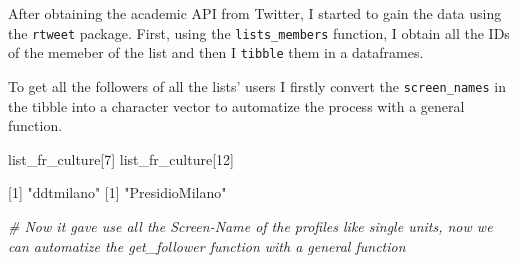 \documentclass[
]{article}
\newenvironment{Shaded}{\begin{snugshade}}{\end{snugshade}}
\newcommand{\AttributeTok}[1]{\textcolor[rgb]{0.77,0.63,0.00}{#1}}
\newcommand{\CommentTok}[1]{\textcolor[rgb]{0.56,0.35,0.01}{\textit{#1}}}
\newcommand{\ConstantTok}[1]{\textcolor[rgb]{0.00,0.00,0.00}{#1}}
\newcommand{\DecValTok}[1]{\textcolor[rgb]{0.00,0.00,0.81}{#1}}
\newcommand{\FunctionTok}[1]{\textcolor[rgb]{0.00,0.00,0.00}{#1}}
\newcommand{\NormalTok}[1]{#1}
\newcommand{\OtherTok}[1]{\textcolor[rgb]{0.56,0.35,0.01}{#1}}
\newcommand{\SpecialCharTok}[1]{\textcolor[rgb]{0.00,0.00,0.00}{#1}}
\newcommand{\StringTok}[1]{\textcolor[rgb]{0.31,0.60,0.02}{#1}}
\begin{document}
After obtaining the academic API from Twitter, I started to gain the
data using the \texttt{rtweet} package. First, using the
\texttt{lists\_members} function, I obtain all the IDs of the memeber of
the list and then I \texttt{tibble} them in a dataframes.

\begin{Shaded}
\end{Shaded}

To get all the followers of all the lists' users I firstly convert the
\texttt{screen\_names} in the tibble into a character vector to
automatize the process with a general function.

\begin{Shaded}
\end{Shaded}

\begin{Shaded}
\begin{Highlighting}[]
\NormalTok{list\_fr\_culture[}\DecValTok{7}\NormalTok{]}
\NormalTok{list\_fr\_culture[}\DecValTok{12}\NormalTok{] }

\NormalTok{[}\DecValTok{1}\NormalTok{] }\StringTok{"ddtmilano"}    
\NormalTok{[}\DecValTok{1}\NormalTok{] }\StringTok{"PresidioMilano"}

\CommentTok{\# Now it gave use all the Screen{-}Name of the profiles like single units, now we can automatize the get\_follower function with a general function}
\end{Highlighting}
\end{Shaded}
\end{document}
